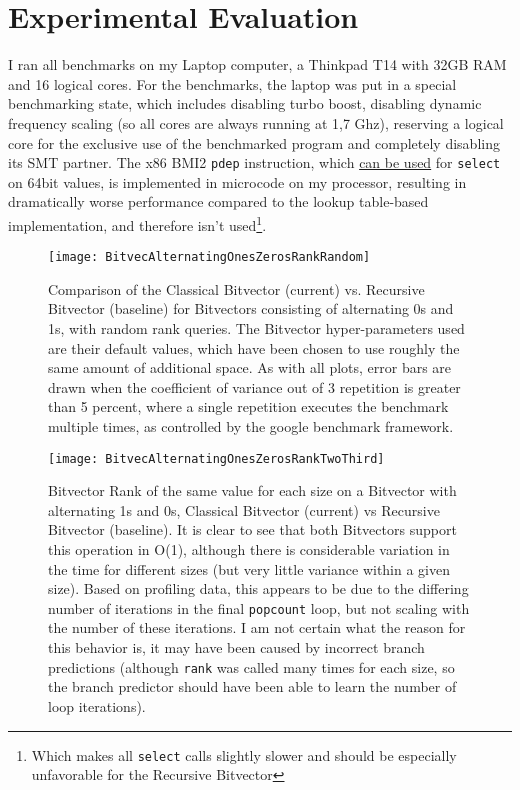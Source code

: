 \documentclass[a4paper,UKenglish,cleveref, autoref, thm-restate]{lipics-v2021}
\newcommand{\rank} {\texttt{rank}}
\newcommand{\select} {\texttt{select}}
\begin{document}
\section{Experimental Evaluation}
\label{ch:Conclusion}
I ran all benchmarks on my Laptop computer, a Thinkpad T14 with 32GB RAM and 16 logical cores.
For the benchmarks, the laptop was put in a special benchmarking state, which includes disabling turbo boost,
disabling dynamic frequency scaling (so all cores are always running at 1,7 Ghz), reserving a logical core for the exclusive use
of the benchmarked program and completely disabling its SMT partner.
The x86 BMI2 \texttt{pdep} instruction, which \href{https://stackoverflow.com/questions/7669057/find-nth-set-bit-in-an-int/27453505#27453505}{can be used} for \select{} on 64bit values, is implemented in microcode on my processor, resulting in dramatically worse performance compared to the lookup table-based implementation, and therefore isn't used\footnote{Which makes all \select{} calls slightly slower
and should be especially unfavorable for the Recursive Bitvector}.

\begin{figure}[h]
\caption{Comparison of the Classical Bitvector (current) vs. Recursive Bitvector (baseline) for Bitvectors consisting of alternating 0s and 1s,
with random rank queries.
The Bitvector hyper-parameters used are their default values, which have been chosen to use roughly the same amount of additional space.
As with all plots, error bars are drawn when the coefficient of variance out of 3 repetition is greater than 5 percent,
where a single repetition executes the benchmark multiple times, as controlled by the google benchmark framework.}
\centering
\texttt{[image: BitvecAlternatingOnesZerosRankRandom]}
\label{fig:BitvecSelectRandom}
\end{figure}

\begin{figure}[h]
\caption{Bitvector Rank of the same value for each size on a Bitvector with alternating 1s and 0s, Classical Bitvector (current) vs Recursive Bitvector (baseline). It is clear to see that both Bitvectors support this operation in O(1), although there is considerable variation in the time for different sizes (but very little variance within a given size). Based on profiling data, this appears to be due to the differing number
of iterations in the final \texttt{popcount} loop, but not scaling with the number of these iterations. I am not certain what the reason for this
behavior is, it may have been caused by incorrect branch predictions (although \rank{} was called many times
for each size, so the branch predictor should have been able to learn the number of loop iterations). }
\centering
\texttt{[image: BitvecAlternatingOnesZerosRankTwoThird]}
\label{fig:rankConstant}
\end{figure}
\end{document}
